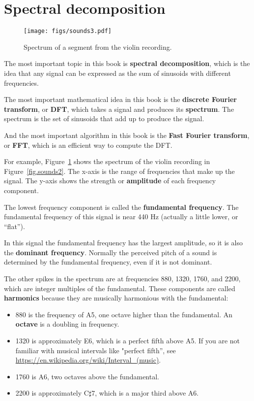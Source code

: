 \section{Spectral decomposition}

\begin{figure}
	\centerline{\texttt{[image: figs/sounds3.pdf]}}
	\caption{Spectrum of a segment from the violin recording.}
	\label{fig.sounds3}
\end{figure}

The most important topic in this book is {\bf spectral decomposition},
which is the idea that any signal can be expressed as the sum of
sinusoids with different frequencies.

The most important mathematical idea in this book is the {\bf discrete
	Fourier transform}, or {\bf DFT}, which takes a signal and produces
its {\bf spectrum}.  The spectrum is the set of sinusoids that add up to
produce the signal.

And the most important algorithm in this book is the {\bf Fast
	Fourier transform}, or {\bf FFT}, which is an efficient way to
compute the DFT.

For example, Figure~\ref{fig.sounds3} shows the spectrum of the violin
recording in Figure~\ref{fig.sounds2}.  The x-axis is the range of
frequencies that make up the signal.  The y-axis shows the strength
or {\bf amplitude} of each frequency component.

The lowest frequency component is called the {\bf fundamental
	frequency}.  The fundamental frequency of this signal is near 440 Hz
(actually a little lower, or ``flat'').

In this signal the fundamental frequency has the largest amplitude,
so it is also the {\bf dominant frequency}.
Normally the perceived pitch of a sound is determined by the
fundamental frequency, even if it is not dominant.

The other spikes in the spectrum are at frequencies 880, 1320, 1760, and
2200, which are integer multiples of the fundamental.
These components are called {\bf harmonics} because they are
musically harmonious with the fundamental:

\begin{itemize}
	
	\item 880 is the frequency of A5, one octave higher than the fundamental.
	An {\bf octave} is a doubling in frequency.
	
	\item 1320 is approximately E6, which is a perfect fifth above A5.
	If you are not familiar with musical intervals like "perfect fifth'', see
	\url{https://en.wikipedia.org/wiki/Interval_(music)}.
	
	\item 1760 is A6, two octaves above the fundamental.
	
	\item 2200 is approximately C$\sharp$7, which is a major third
	above A6.
	
\end{itemize}

